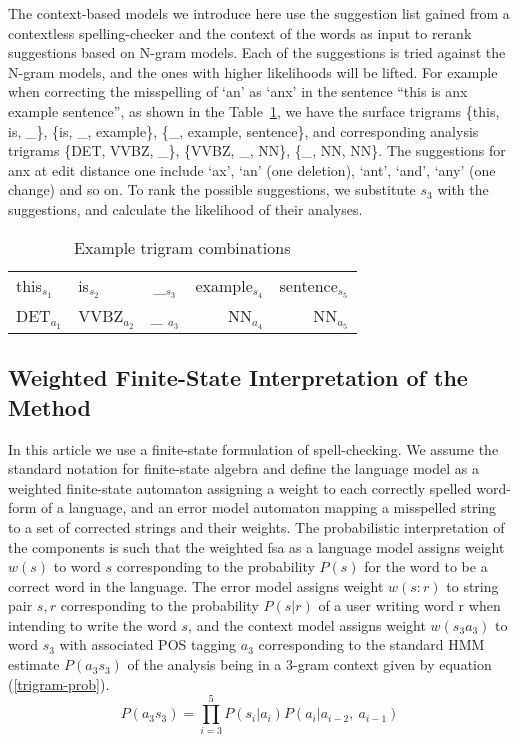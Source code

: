 \documentclass{llncs}
\begin{document}
The context-based models we introduce here use the suggestion list gained from
a contextless spelling-checker and the context of the words as input to rerank
suggestions based on N-gram models. Each of the suggestions is tried against
the N-gram models, and the ones with higher likelihoods will be lifted.  For
example when correcting the misspelling of `an' as `anx' in the sentence ``this
is anx example sentence'', as shown in the Table~\ref{fig:example}, we have the
surface trigrams \{this, is, \_\}, \{is, \_, example\}, \{\_, example,
sentence\}, and corresponding analysis trigrams \{DET, VVBZ, \_\}, \{VVBZ, \_,
NN\}, \{\_, NN, NN\}. The suggestions for anx at edit distance one include
`ax', `an' (one deletion), `ant', `and', `any' (one change) and so on. To rank
the possible suggestions, we substitute $s_3$ with the suggestions, and
calculate the likelihood of their analyses. 

\begin{table}
\caption{Example trigram combinations\label{fig:example}}
\begin{center}
\begin{tabular}{llcrr}
\hline
this$_{s_1}$ & is$_{s_2}$ & \_$_{s_3}$ & example$_{s_4}$ & sentence$_{s_5}$\\
DET$_{a_1}$ & VVBZ$_{a_2}$ & \_ $_{a_3}$& NN$_{a_4}$ & NN$_{a_5}$\\
\hline
\end{tabular}
\end{center}
\end{table}

\subsection{Weighted Finite-State Interpretation of the Method}

In this article we use a finite-state formulation of
spell-checking. We assume the standard notation for finite-state
algebra and define the language model as a weighted finite-state
automaton assigning a weight to each correctly spelled word-form of a
language, and an error model automaton mapping a misspelled string to
a set of corrected strings and their weights. The probabilistic
interpretation of the components is such that the weighted fsa as a
language model assigns weight $w(s)$ to word $s$ corresponding to the
probability $P(s)$ for the word to be a correct word in the
language. The error model assigns weight $w(s:r)$ to string pair $s,
r$ corresponding to the probability $P(s|r)$ of a user writing word r
when intending to write the word $s$, and the context model assigns
weight $w(s_3 a_3)$ to word $s_3$ with associated POS tagging $a_3$
corresponding to the standard HMM estimate $P(a_3 s_3)$ of the analysis being in
a 3-gram context given by equation (\ref{trigram-prob}).
\begin{equation}\label{trigram-prob}
P(a_3 s_3) = \prod_{i=3}^{5}P(s_i|a_i)P(a_i|a_{i-2},\ a_{i-1})
\end{equation}
\end{document}
